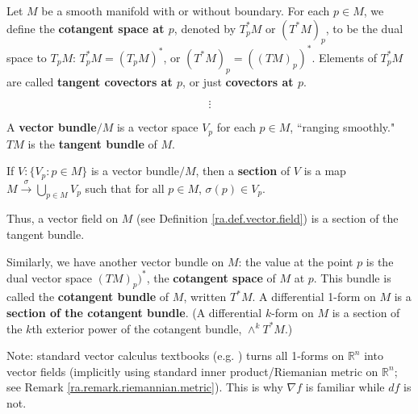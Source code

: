 \begin{definition}\label{ra.def.cotangent.space}

Let \(M\) be a smooth manifold with or without boundary. For each \(p \in M\), we define the \textbf{cotangent space at \(p\)}, denoted by \(T_p^*M\) or \((T^* M)_p\), to be the dual space to \(T_pM\): \(T_p^*M = (T_pM)^*\), or \((T^* M)_p = ((TM)_p)^*\). Elements of \(T_p^*M\) are called \textbf{tangent covectors at \(p\)}, or just \textbf{covectors at \(p\)}.

\end{definition}


\[
\vdots
\]


\begin{definition}

A \textbf{vector bundle\(/M\)} is a vector space \(V_p\) for each \(p \in M\), ``ranging smoothly." \(TM\) is the \textbf{tangent bundle} of \(M\).

\end{definition}


\begin{definition}

If \(V: \{V_p: p \in M\}\) is a vector bundle\(/M\), then a \textbf{section} of \(V\) is a map \(M \xrightarrow{\sigma} \bigcup_{p \in M} V_p\) such that for all \(p \in M\), \(\sigma(p) \in V_p\).

Thus, a vector field on \(M\) (see Definition \ref{ra.def.vector.field}) is a section of the tangent bundle.

Similarly, we have another vector bundle on \(M\): the value at the point \(p\) is the dual vector space \((TM)_p)^*\), the \textbf{cotangent space} of \(M\) at \(p\). This bundle is called the \textbf{cotangent bundle} of \(M\), written \(T^* M\). A differential 1-form on \(M\) is a \textbf{section of the cotangent bundle}. (A differential \(k\)-form on \(M\) is a section of the \(k\)th exterior power of the cotangent bundle, \(\wedge^k T^* M\).)
 

\end{definition}

Note: standard vector calculus textbooks (e.g. \citet{stewart2015calculus}) turns all 1-forms on \(\mathbb{R}^n\) into vector fields (implicitly using standard inner product/Riemanian metric on \(\mathbb{R}^n\); see Remark \ref{ra.remark.riemannian.metric}). This is why \(\nabla f\) is familiar while \(df\) is not.


